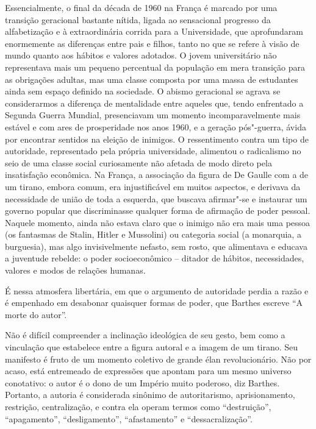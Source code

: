 Essencialmente, o final da década de 1960 na França é marcado por uma
transição geracional bastante nítida, ligada ao sensacional progresso da
alfabetização e à extraordinária corrida para a Universidade, que
aprofundaram enormemente as diferenças entre pais e filhos, tanto no que
se refere à visão de mundo quanto aos hábitos e valores adotados. O
jovem universitário não representava mais um pequeno percentual da
população em mera transição para as obrigações adultas, mas uma classe
composta por uma massa de estudantes ainda sem espaço definido na
sociedade. O abismo geracional se agrava se considerarmos a diferença de
mentalidade entre aqueles que, tendo enfrentado a Segunda Guerra
Mundial, presenciavam um momento incomparavelmente mais estável e com
ares de prosperidade nos anos 1960, e a geração pós"-guerra, ávida por
encontrar sentidos na eleição de inimigos. O ressentimento contra um
tipo de autoridade, representado pela própria universidade, alimentou o
radicalismo no seio de uma classe social curiosamente não afetada de
modo direto pela insatisfação econômica. Na França, a associação da
figura de De Gaulle com a de um tirano, embora comum, era injustificável
em muitos aspectos, e derivava da necessidade de união de toda a
esquerda, que buscava afirmar"-se e instaurar um governo popular que
discriminasse qualquer forma de afirmação de poder pessoal. Naquele
momento, ainda não estava claro que o inimigo não era mais uma pessoa
(os fantasmas de Stalin, Hitler e Mussolini) ou categoria social (a
monarquia, a burguesia), mas algo invisivelmente nefasto, sem rosto, que
alimentava e educava a juventude rebelde: o poder socioeconômico --
ditador de hábitos, necessidades, valores e modos de relações humanas.

É nessa atmosfera libertária, em que o argumento de autoridade perdia a
razão e é empenhado em desabonar quaisquer formas de poder, que Barthes
escreve ``A morte do autor''.

Não é difícil compreender a inclinação ideológica de seu gesto, bem como
a vinculação que estabelece entre a figura autoral e a imagem de um
tirano. Seu manifesto é fruto de um momento coletivo de grande élan
revolucionário. Não por acaso, está entremeado de expressões que apontam
para um mesmo universo conotativo: o autor é o dono de um Império muito
poderoso, diz Barthes. Portanto, a autoria é considerada sinônimo de
autoritarismo, aprisionamento, restrição, centralização, e contra ela
operam termos como ``destruição'', ``apagamento'', ``desligamento'',
``afastamento'' e ``dessacralização''.

